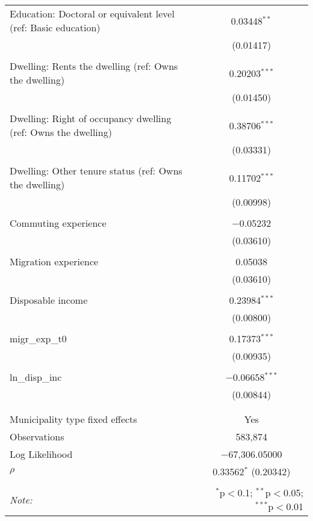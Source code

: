 \begin{table}[!htbp]
\begin{tabular}{@{\extracolsep{5pt}}lc}
 Education: Doctoral or equivalent level (ref: Basic education) & 0.03448$^{**}$ \\ 
  & (0.01417) \\ 
  & \\ 
 Dwelling: Rents the dwelling (ref: Owns the dwelling) & 0.20203$^{***}$ \\ 
  & (0.01450) \\ 
  & \\ 
 Dwelling: Right of occupancy dwelling (ref: Owns the dwelling) & 0.38706$^{***}$ \\ 
  & (0.03331) \\ 
  & \\ 
 Dwelling: Other tenure status (ref: Owns the dwelling) & 0.11702$^{***}$ \\ 
  & (0.00998) \\ 
  & \\ 
 Commuting experience & $-$0.05232 \\ 
  & (0.03610) \\ 
  & \\ 
 Migration experience & 0.05038 \\ 
  & (0.03610) \\ 
  & \\ 
 Disposable income & 0.23984$^{***}$ \\ 
  & (0.00800) \\ 
  & \\ 
 migr\_exp\_t0 & 0.17373$^{***}$ \\ 
  & (0.00935) \\ 
  & \\ 
 ln\_disp\_inc & $-$0.06658$^{***}$ \\ 
  & (0.00844) \\ 
  & \\ 
\hline \\[-1.8ex] 
Municipality type fixed effects & Yes \\ 
Observations & 583,874 \\ 
Log Likelihood & $-$67,306.05000 \\ 
$\rho$ & 0.33562$^{*}$  (0.20342) \\ 
\hline 
\hline \\[-1.8ex] 
\textit{Note:}  & \multicolumn{1}{r}{$^{*}$p$<$0.1; $^{**}$p$<$0.05; $^{***}$p$<$0.01} \\ 
\end{tabular} 
\end{table} 
